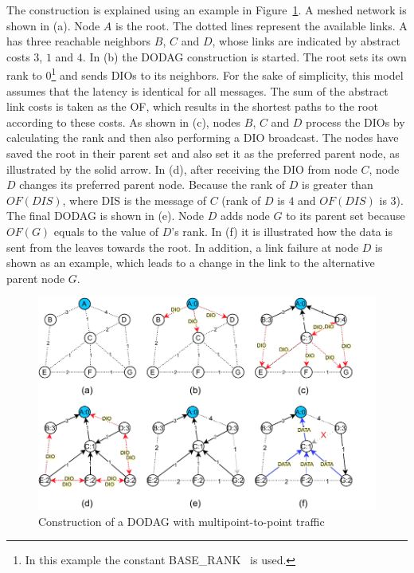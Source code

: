 \documentclass[english,version-2019-11]{uzl-thesis}
\begin{document}
The construction is explained using an example in Figure~\ref{DIO}.
A meshed network is shown in (a). Node $A$ is the root.
The dotted lines represent the available links.
A has three reachable neighbors $B$, $C$ and $D$, whose links
are indicated by abstract costs $3$, $1$ and $4$.
In (b) the DODAG construction is started.
The root sets its own rank to $0$\footnote{In this example the constant BASE\_RANK~\cite{rfc6550} is used.} and sends DIOs to its neighbors.
For the sake of simplicity, this model assumes that the latency is identical
for all messages. The sum of the abstract link costs is taken as the OF,
which results in the shortest paths to the root according to these costs.
As shown in (c), nodes $B$, $C$ and $D$ process the DIOs by calculating
the rank and then also performing a DIO broadcast.
The nodes have saved the root in their parent set and also
set it as the preferred parent node, as illustrated by
the solid arrow. In (d), after receiving the DIO from
node $C$, node $D$ changes its preferred parent node.
Because the rank of $D$ is greater than $OF(DIS)$,
where DIS is the message of $C$
(rank of $D$ is $4$ and $OF(DIS)$ is $3$).
The final DODAG is shown in (e). Node $D$ adds node $G$
to its parent set because $OF(G)$ equals
to the value of $D$’s rank. In (f) it is illustrated
how the data is sent from the leaves towards the root.
In addition, a link failure at node $D$ is shown
as an example, which leads to a change in the
link to the alternative parent node $G$.
\begin{figure}[htpb]
  \centering
  \includegraphics{DIO.pdf}
  \caption{Construction of a DODAG with multipoint-to-point traffic}
  \label{DIO}
\end{figure}
\end{document}
